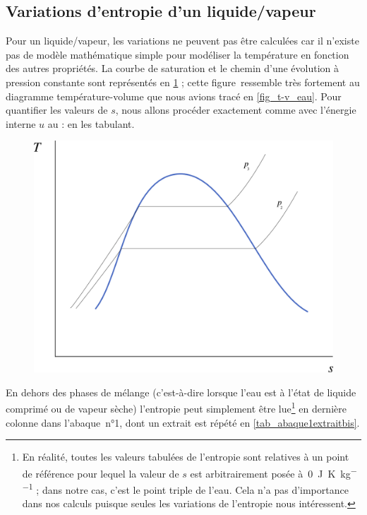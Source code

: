 	\subsection{Variations d’entropie d’un liquide/vapeur}
	
		Pour un liquide/vapeur, les variations ne peuvent pas être calculées car il n’existe pas de modèle mathématique simple pour modéliser la température en fonction des autres propriétés. La courbe de saturation et le chemin d’une évolution à pression constante sont représentés en \cref{fig_ts_lv} ; cette figure~ressemble très fortement au diagramme température-volume que nous avions tracé en \cref{fig_t-v_eau}.
		Pour quantifier les valeurs de $s$, nous allons procéder exactement comme avec l’énergie interne $u$ au \courscinqshort : en les tabulant.

		\begin{figure}
			\begin{center}
				\includegraphics[width=\didacticpvdiagramwidth]{images/ts_lv.png}
			\end{center}
			\label{fig_ts_lv}
		\end{figure}
		
		En dehors des phases de mélange (c’est-à-dire lorsque l’eau est à l’état de liquide comprimé ou de vapeur sèche) l’entropie peut simplement être lue\footnote{En réalité, toutes les valeurs tabulées de l’entropie sont relatives à un point de référence pour lequel la valeur de $s$ est arbitrairement posée à~\SI{0}{\joule\per\kelvin\per\kilogram} ; dans notre cas, c’est le point triple de l’eau. Cela n’a pas d’importance dans nos calculs puisque seules les variations de l’entropie nous intéressent.} en dernière colonne dans l’abaque~n°1, dont un extrait est répété en \cref{tab_abaque1extraitbis}.
		
